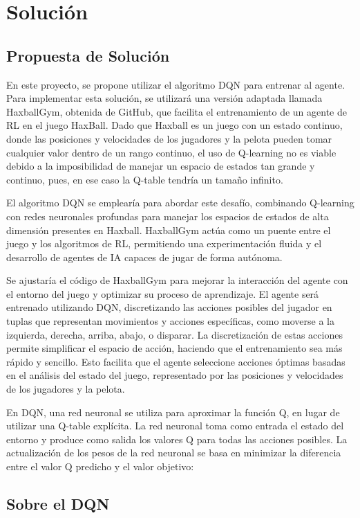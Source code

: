 \documentclass[10pt]{article}
\begin{document}
\section{Solución}
\subsection{Propuesta de Solución}

En este proyecto, se propone utilizar el algoritmo DQN para entrenar al agente. Para implementar esta solución, se utilizará una versión adaptada llamada HaxballGym, obtenida de GitHub, que facilita el entrenamiento de un agente de RL en el juego HaxBall. Dado que Haxball es un juego con un estado continuo, donde las posiciones y velocidades de los jugadores y la pelota pueden tomar cualquier valor dentro de un rango continuo, el uso de Q-learning no es viable debido a la imposibilidad de manejar un espacio de estados tan grande y continuo, pues, en ese caso la Q-table tendría un tamaño infinito.

El algoritmo DQN se emplearía para abordar este desafío, combinando Q-learning con redes neuronales profundas para manejar los espacios de estados de alta dimensión presentes en Haxball. HaxballGym actúa como un puente entre el juego y los algoritmos de RL, permitiendo una experimentación fluida y el desarrollo de agentes de IA capaces de jugar de forma autónoma.

Se ajustaría el código de HaxballGym para mejorar la interacción del agente con el entorno del juego y optimizar su proceso de aprendizaje. El agente será entrenado utilizando DQN, discretizando las acciones posibles del jugador en tuplas que representan movimientos y acciones específicas, como moverse a la izquierda, derecha, arriba, abajo, o disparar. La discretización de estas acciones permite simplificar el espacio de acción, haciendo que el entrenamiento sea más rápido y sencillo. Esto facilita que el agente seleccione acciones óptimas basadas en el análisis del estado del juego, representado por las posiciones y velocidades de los jugadores y la pelota.

En DQN, una red neuronal se utiliza para aproximar la función Q, en lugar de utilizar una Q-table explícita. La red neuronal toma como entrada el estado del entorno y produce como salida los valores Q para todas las acciones posibles. La actualización de los pesos de la red neuronal se basa en minimizar la diferencia entre el valor Q predicho y el valor objetivo:

\subsection{Sobre el DQN}
\end{document}
